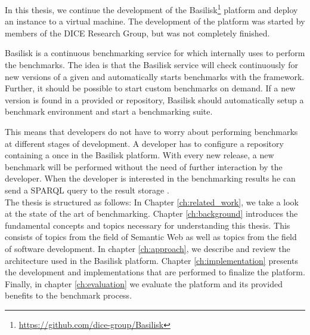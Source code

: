 In this thesis, we continue the development of the Basilisk\footnote{\url{https://github.com/dice-group/Basilisk}} platform and deploy an instance to a virtual machine.
The development of the platform was started by members of the DICE Research Group, but was not completely finished.

Basilisk is a continuous benchmarking service for \tsp{} which internally uses \iguana{} to perform the benchmarks.
The idea is that the Basilisk service will check continuously for new versions of a given \tsp{} and automatically starts benchmarks with the \iguana{} framework.
Further, it should be possible to start custom benchmarks on demand.
If a new version is found in a provided \gh{} or \dockh{} repository, Basilisk should automatically setup a benchmark environment and start a benchmarking suite.

This means that developers do not have to worry about performing benchmarks at different stages of development.
A developer has to configure a repository containing a \ts{} once in the Basilisk platform.
With every new release, a new benchmark will be performed without the need of further interaction by the developer.
When the developer is interested in the benchmarking results he can send a SPARQL query to the result storage \ts{}.
\\

The thesis is structured as follows:
In Chapter \ref{ch:related_work}, we take a look at the state of the art of \ts{} benchmarking. 
Chapter \ref{ch:background} introduces the fundamental concepts and topics necessary for understanding this thesis.
This consists of topics from the field of Semantic Web as well as topics from the field of software development.
In chapter \ref{ch:approach}, we describe and review the architecture used in the Basilisk platform.
Chapter \ref{ch:implementation} presents the development and implementations that are performed to finalize the platform.
Finally, in chapter \ref{ch:evaluation} we evaluate the platform and its provided benefits to the \ts{} benchmark process.

